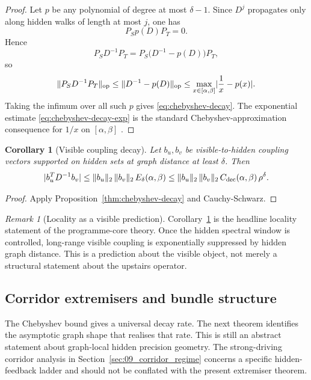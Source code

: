 \documentclass[11pt]{article}
\numberwithin{equation}{section}
\DeclarePairedDelimiter{\abs}{\lvert}{\rvert}
\DeclarePairedDelimiter{\norm}{\lVert}{\rVert}
\theoremstyle{thmcompact}
\newtheorem{corollary}[theorem]{Corollary}
\theoremstyle{remark}
\newtheorem*{remarkplain}{Remark}
\newenvironment{remark}[1][]%
{\begin{remarkbox}\begin{remarkplain}[#1]\normalfont}
		{\end{remarkplain}\end{remarkbox}}
\begin{document}
\begin{proof}
Let $p$ be any polynomial of degree at most $\delta-1$. Since $D^j$ propagates only along hidden walks of length at most $j$, one has
\[
P_S p(D) P_T = 0.
\]
Hence
\[
P_S D^{-1} P_T = P_S\bigl(D^{-1}-p(D)\bigr)P_T,
\]
so
\[
\|P_S D^{-1} P_T\|_{\mathrm{op}}
\le
\|D^{-1}-p(D)\|_{\mathrm{op}}
\le
\max_{x\in[\alpha,\beta]} \abs{\frac1x-p(x)}.
\]
Taking the infimum over all such $p$ gives \eqref{eq:chebyshev-decay}. The exponential estimate \eqref{eq:chebyshev-decay-exp} is the standard Chebyshev-approximation consequence for $1/x$ on $[\alpha,\beta]$ \cite{DemkoMossSmith1984,Rivlin1974,Trefethen2013}.
\end{proof}

\begin{corollary}[Visible coupling decay]\label{cor:visible-decay}
Let $b_u,b_v$ be visible-to-hidden coupling vectors supported on hidden sets at graph distance at least $\delta$. Then
\begin{equation}\label{eq:visible-decay}
\abs{b_u^T D^{-1} b_v}
\le
\norm{b_u}_2\,\norm{b_v}_2\,E_\delta(\alpha,\beta)
\le
\norm{b_u}_2\,\norm{b_v}_2\,C_{\mathrm{dec}}(\alpha,\beta)\,\rho^\delta.
\end{equation}
\end{corollary}

\begin{proof}
Apply Proposition~\ref{thm:chebyshev-decay} and Cauchy-Schwarz.
\end{proof}

\begin{remark}[Locality as a visible prediction]
Corollary~\ref{cor:visible-decay} is the headline locality statement of the programme-core theory. Once the hidden spectral window is controlled, long-range visible coupling is exponentially suppressed by hidden graph distance. This is a prediction about the visible object, not merely a structural statement about the upstairs operator.
\end{remark}

\subsection{Corridor extremisers and bundle structure}
\label{subsec:corridor-extremisers}

The Chebyshev bound gives a universal decay rate. The next theorem identifies the asymptotic graph shape that realises that rate. This is still an abstract statement about graph-local hidden precision geometry. The strong-driving corridor analysis in Section~\ref{sec:09_corridor_regime} concerns a specific hidden-feedback ladder and should not be conflated with the present extremiser theorem.
\end{document}
